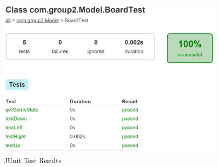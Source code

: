 \documentclass[12pt]{article}
\begin{document}
\begin{figure}[!htbp]
	\centering
	\includegraphics[width = 14cm]{JUnit_Test_Results}
	\caption{JUnit Test Results}
	\label{JUnit Test Results}
\end{figure}
\end{document}
